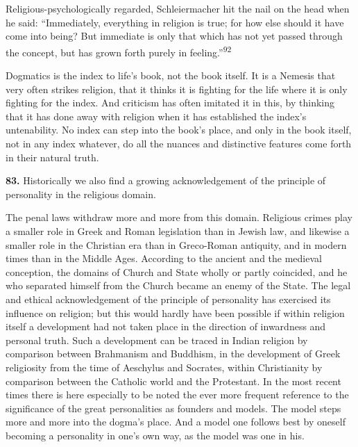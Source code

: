\documentclass[12pt,a4paper]{book}
\newcommand{\opage}[1]{\marginnote{\footnotesize\textit{[#1]}}}
\begin{document}
Religious-psychologically regarded, Schleiermacher hit the nail on the head when he said: ``Immediately,
everything in religion is true; 
\opage{193}for how else should it have come into being? But immediate is only that
which has not yet passed through the concept, but has grown forth purely in
feeling.''\textsuperscript{92}

Dogmatics is the index to life's book, not the book itself.
It is a Nemesis that very often strikes religion, that it thinks it is fighting for the life where it is
only fighting for the index.
And criticism has often imitated it in this, by thinking that it has done away with religion when it has
established the index's untenability. No index can step into the book's place, and only in the book
itself, not in any index whatever, do all the nuances and distinctive features come forth in their natural
truth.

\medskip

\noindent\textbf{83.} Historically we also find a growing acknowledgement of the principle of personality
in the religious domain.

The penal laws withdraw more and more from this domain. Religious crimes play a smaller role in Greek and
Roman legislation than in Jewish law, and likewise a smaller role in the Christian era than in
Greco-Roman antiquity, and in modern times than in the Middle Ages. According to the ancient and the
medieval conception, the domains of Church and State wholly or partly coincided, and he who separated
himself from the Church became an enemy of the State. The legal and ethical acknowledgement of the
principle of personality has exercised its influence on religion; but this would hardly have been possible
if within religion itself a development had not taken place in the direction of inwardness and personal
truth. Such a development can be traced in Indian religion by comparison between Brahmanism and Buddhism,
in the development of Greek religiosity from the time of Aeschylus and Socrates, within Christianity by
comparison between the Catholic world and the Protestant. In the most recent times there is here especially
to be noted the ever more frequent reference to the significance of the great personalities as founders and
models. The model steps more and more into the dogma's place. And a model one follows best by oneself
becoming a personality in one's own way, as the model was one in his.
\end{document}
